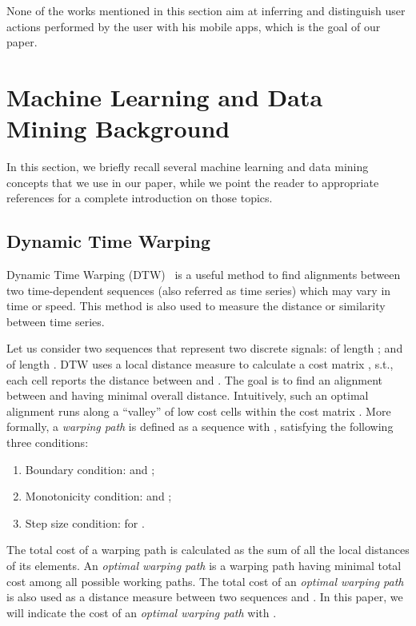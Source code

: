\documentclass{acm_proc_article-sp}
\newcommand{\hilight}[1]{#1}
\begin{document}
None of the works mentioned in this section aim at \hilight{inferring and distinguish user actions performed by the user with his mobile apps},
which is the goal of our paper.




\section{Machine Learning and Data Mining Background}
\label{ML and DM tools}
In this section, we briefly recall several machine learning and data mining concepts that we use in our paper, while we point the reader to appropriate references for a complete introduction on those topics.


\subsection{Dynamic Time Warping}
\label{DTW}
Dynamic Time Warping (DTW)~\cite{Muller:2007:IRM:1324818} is a useful method to find
alignments between two time-dependent sequences (also referred as time series) which 
may vary in time or speed. This method is also used to measure the distance or 
similarity between time series.

Let us consider two sequences that 
represent two discrete signals:
 of length 
; and   of length .
DTW uses a local distance measure 
 to calculate 
a cost matrix , s.t., each cell  reports the distance between  and . 
The goal is to find an alignment between  and  having minimal 
overall distance. Intuitively, such an optimal alignment runs along a ``valley'' of 
low cost cells within the cost
matrix . More formally, a \emph{warping path} is defined as a sequence 
 with ,  
satisfying the following three conditions:
\begin{enumerate}
 \item Boundary condition:  and ;
 \item Monotonicity condition:  and ;
 \item Step size condition:  for 
.
\end{enumerate}
The total cost of a 
warping path is calculated as the sum of all the local distances of its 
elements. An \emph{optimal warping path} is a warping path  
having 
minimal total cost among all possible working paths. The total cost of an 
\emph{optimal warping path} is also used as a 
distance measure between two sequences  and . In this paper, we will 
indicate the cost of an \emph{optimal warping path} with .
\end{document}
